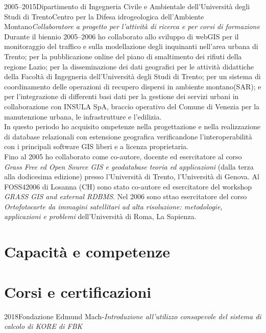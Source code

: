 \documentclass{curriculum}
\begin{document}
    \begin{entrylist}
    \entry
        {2005--2015}{Dipartimento di Ingegneria Civile e Ambientale dell'Università degli Studi di Trento}{Centro per la Difesa idrogeologica dell'Ambiente Montano}{\emph{Collaboratore a progetto per l'attività di ricerca e per corsi di formazione}\hfill\vspace{3pt}\\
        Durante il biennio 2005--2006 ho collaborato allo sviluppo di webGIS per il monitoraggio del traffico e sulla modellazione degli inquinanti nell'area urbana di Trento; per la pubblicazione online del piano di smaltimento dei rifiuti della regione Lazio; per la disseminazione dei dati geografici per le attività didattiche della Facoltà di Ingegneria dell'Università degli Studi di Trento; per un sistema di coordinamento delle operazioni di recupero dispersi in ambiente montano(SAR); e per l'integrazione di differenti basi dati per la gestione dei servizi urbani in collaborazione con INSULA SpA, braccio operativo del Comune di Venezia per la manutenzione urbana, le infrastrutture e l'edilizia.
        \\In questo periodo ho acquisito ompetenze nella progettazione e nella realizzazione di database relazionali con estensione geografica verificandone l'interoperabilità con i principali software GIS liberi e a licenza proprietaria.
        \\Fino al 2005 ho collaborato come co-autore, docente ed esercitatore al corso \textit{Grass Free ed Open Source GIS e geodatabase teoria ed applicazioni} (dalla terza alla dodicesima edizione) presso l'Università di Trento, l'Università di Genova. Al FOSS42006 di Losanna (CH) sono stato co-autore ed esercitatore del workshop \textit{GRASS GIS and external RDBMS}. Nel 2006 sono sttao esercitatore del corso \textit{Ortofotocarte da immagini satellitari ad alta risoluzione: metodologie, applicazioni e problemi} dell'Università di Roma, La Sapienza.}
    \end{entrylist}
    
    \section{Capacità e competenze}
    
    \section{Corsi e certificazioni}
    \begin{entrylist}
    \entry
        {2018}{Fondazione Edmund Mach}{-}{\emph{Introduzione all'utilizzo consapevole del sistema di calcolo di KORE di FBK}}
    \end{entrylist}
    
\end{document}
